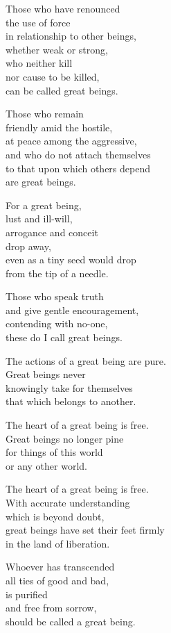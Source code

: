 Those who have renounced\\
the use of force\\
in relationship to other beings,\\
whether weak or strong,\\
who neither kill\\
nor cause to be killed,\\
can be called great beings.


Those who remain\\
friendly amid the hostile,\\
at peace among the aggressive,\\
and who do not attach themselves\\
to that upon which others depend\\
are great beings.


For a great being,\\
lust and ill-will,\\
arrogance and conceit\\
drop away,\\
even as a tiny seed would drop\\
from the tip of a needle.


Those who speak truth\\
and give gentle encouragement,\\
contending with no-one,\\
these do I call great beings.


The actions of a great being are pure.\\
Great beings never\\
knowingly take for themselves\\
that which belongs to another.

The heart of a great being is free.\\
Great beings no longer pine\\
for things of this world\\
or any other world.


The heart of a great being is free.\\
With accurate understanding\\
which is beyond doubt,\\
great beings have set their feet firmly\\
in the land of liberation.


Whoever has transcended\\
all ties of good and bad,\\
is purified\\
and free from sorrow,\\
should be called a great being.


